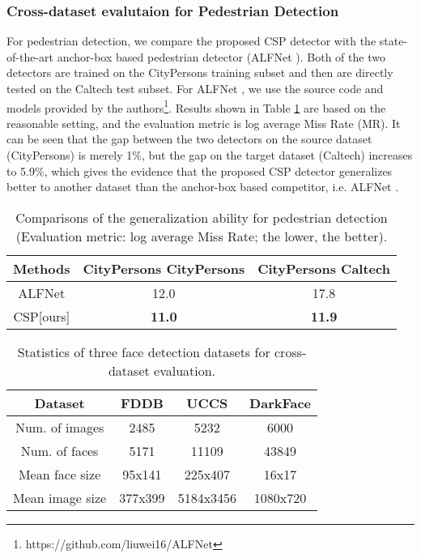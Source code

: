 \documentclass[review]{elsarticle}
\begin{document}
\subsubsection{Cross-dataset evalutaion for Pedestrian Detection}
For pedestrian detection, we compare the proposed CSP detector with the state-of-the-art anchor-box based pedestrian detector (ALFNet \cite{Liu_2018_ECCV}). Both of the two detectors are trained on the CityPersons \cite{zhang2017citypersons} training subset and then are directly tested on the Caltech \cite{dollar2012pedestrian} test subset. For ALFNet \cite{Liu_2018_ECCV}, we use the source code and models provided by the authors\footnote{https://github.com/liuwei16/ALFNet}.
Results shown in Table \ref{table:1} are based on the reasonable setting, and the evaluation metric is log average Miss Rate (MR). It can be seen that the gap between the two detectors on the source dataset (CityPersons) is merely 1\%, but the gap on the target dataset (Caltech) increases to 5.9\%, which gives the evidence that the proposed CSP detector generalizes better to another dataset than the anchor-box based competitor, i.e. ALFNet \cite{Liu_2018_ECCV}.

\begin{table}
\begin{center}
\begin{tabular}{c|c|c}
\hline
Methods & CityPersons  CityPersons & CityPersons  Caltech\\
\hline
\hline
ALFNet\cite{Liu_2018_ECCV} & 12.0 & 17.8\\
\hline
CSP[ours] & \textbf{11.0} & \textbf{11.9}\\
\hline
\end{tabular}
\end{center}
\caption{Comparisons of the generalization ability for pedestrian detection (Evaluation metric: log average Miss Rate; the lower, the better).}
\label{table:1}
\end{table}

\begin{table}
\begin{center}
\begin{tabular}{c|c|c|c}
\hline
Dataset & FDDB \cite{fddbTech} & UCCS \cite{uccs} & DarkFace \cite{wei2018deep}\\
\hline
\hline
Num. of images & 2485 & 5232 & 6000\\
\hline
Num. of faces & 5171 & 11109 & 43849\\
\hline
Mean face size & 95x141 & 225x407 & 16x17\\
\hline
Mean image size & 377x399 & 5184x3456 & 1080x720\\
\hline
\end{tabular}
\end{center}
\caption{Statistics of three face detection datasets for cross-dataset evaluation.}
\label{table:2}
\end{table}
\end{document}
